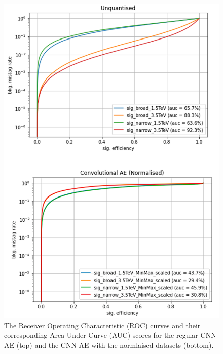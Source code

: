 \documentclass[a4paper]{article}
\theoremstyle{plain}
\theoremstyle{definition}
\begin{document}
            \begin{figure}[H]
                \centering
                    \begin{minipage}[c]{0.45\linewidth}
                        \centering
                        \includegraphics[width=\textwidth]{cnn-roc.png}
                        \caption{The Receiver Operating Characteristic (ROC) curves and their corresponding Area Under Curve (AUC) scores for the regular CNN AE (top) and the CNN AE with the normlaised datasets (bottom).}
                        \label{fig:cnn-roc}
                    \end{minipage}
                \hfill
                    \begin{minipage}[c]{0.45\linewidth}
                        \centering

\end{minipage}
\end{figure}
\end{document}
